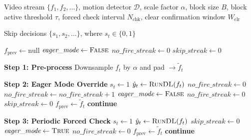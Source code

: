 \begin{algorithm}[ht]
\caption{Skip Module $\mathcal{S}$: Motion-Based Gating with Eager Mode and Periodic Forced Check}
\label{alg:skipmodule_eager}
\begin{algorithmic}[1]

\Require Video stream $\{f_1, f_2, \dots\}$, motion detector $\mathcal{D}$,
scale factor $\alpha$, block size $B$, block active threshold $\tau$,
forced check interval $N_{\text{chk}}$, clear confirmation window $W_{\text{clr}}$

\Ensure Skip decisions $\{s_1, s_2, \dots\}$, where $s_t \in \{0,1\}$

\State $f_{\text{prev}} \leftarrow \text{null}$
\State $\textit{eager\_mode} \leftarrow \textsc{False}$    
\State $\textit{no\_fire\_streak} \leftarrow 0$             
\State $\textit{skip\_streak} \leftarrow 0$                


    \Statex \hspace{1.5em} \textbf{Step 1: Pre-process}
    \State Downsample $f_t$ by $\alpha$ and pad $\rightarrow \tilde{f}_t$

    \Statex \hspace{1.5em} \textbf{Step 2: Eager Mode Override}
        \State $s_t \leftarrow 1$  
        \State $\hat{y}_t \leftarrow \textsc{RunDL}(f_t)$
            \State $\textit{no\_fire\_streak} \leftarrow 0$  
        \Else
            \State $\textit{no\_fire\_streak} \leftarrow \textit{no\_fire\_streak} + 1$
                \State $\textit{eager\_mode} \leftarrow \textsc{False}$  
                \State $\textit{no\_fire\_streak} \leftarrow 0$
                \State $\textit{skip\_streak} \leftarrow 0$
            \EndIf
        \EndIf
        \State $f_{\text{prev}} \leftarrow \tilde{f}_t$
        \State \textbf{continue}
    \EndIf

    \Statex \hspace{1.5em} \textbf{Step 3: Periodic Forced Check}
        \State $s_t \leftarrow 1$  
        \State $\hat{y}_t \leftarrow \textsc{RunDL}(f_t)$
        \State $\textit{skip\_streak} \leftarrow 0$
            \State $\textit{eager\_mode} \leftarrow \textsc{True}$  
            \State $\textit{no\_fire\_streak} \leftarrow 0$
        \EndIf
        \State $f_{\text{prev}} \leftarrow \tilde{f}_t$
        \State \textbf{continue}
    \EndIf


\end{algorithmic}
\end{algorithm}
